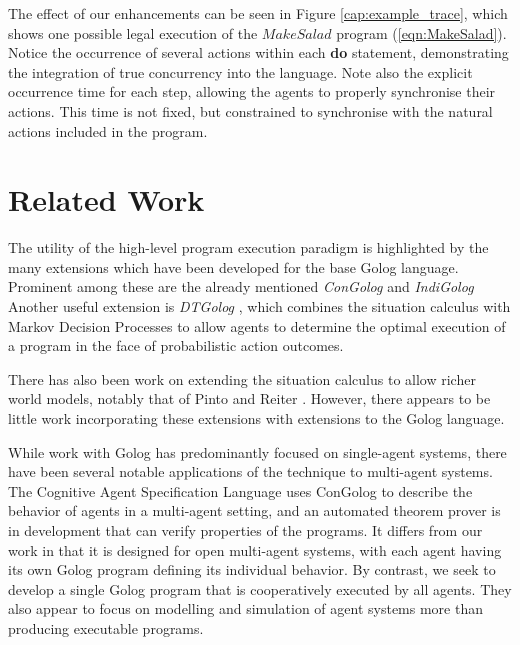 \documentclass[letterpaper]{article}
\begin{document}
The effect of our enhancements can be seen in Figure
\ref{cap:example_trace}, which shows one possible legal execution of the
$MakeSalad$ program (\ref{eqn:MakeSalad}). Notice the occurrence of several
actions within each \textbf{do} statement, demonstrating the integration
of true concurrency into the language.
Note also the explicit occurrence time for
each step, allowing the agents to properly synchronise their actions.
This time is not fixed, but constrained to synchronise with the natural
actions included in the program.

\section{Related Work}

The utility of the high-level program execution paradigm is highlighted
by the many extensions which have been developed for the base Golog
language. Prominent among these are the already mentioned \emph{ConGolog}
\cite{giacomo00congolog} and 
\emph{IndiGolog} \cite{giacomo99indigolog}
Another useful extension is \emph{DTGolog} \cite{boutilier00dtgolog}, which
combines the situation calculus with Markov Decision Processes to
allow agents to determine the optimal execution of a program in the face
of probabilistic action outcomes.

There has also been work on extending the situation calculus to allow
richer world models, notably that of Pinto \cite{pinto94temporal}
and Reiter \cite{reiter96sc_nat_conc}. 
However, there appears to be little work incorporating these
extensions with extensions to the Golog language.

While work with Golog has predominantly focused on single-agent systems,
there have been several notable applications of the technique to multi-agent
systems. The Cognitive Agent Specification Language \cite{shapiro02casl}
uses ConGolog to describe the behavior of agents in a multi-agent
setting, and an automated theorem prover is in development that can
verify properties of the programs. It differs from our work in that
it is designed for open multi-agent systems, with each agent having
its own Golog program defining its individual behavior. By contrast, we seek
to develop a single Golog program that is cooperatively executed by
all agents. They also appear to focus on modelling and simulation
of agent systems more than producing executable programs.
\end{document}
